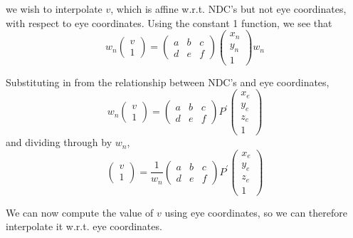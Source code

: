 \documentclass[11pt]{tingpset}
\begin{document}
  we wish to interpolate $v$, which is affine w.r.t. NDC's but not eye coordinates, with respect to eye coordinates. Using the constant 1 function, we see that
  \[
    w_n
    \begin{pmatrix}
      v \\
      1
    \end{pmatrix}
    =
    \begin{pmatrix}
      a & b & c \\
      d & e & f
    \end{pmatrix}
    \begin{pmatrix}
      x_n \\
      y_n \\
      1
    \end{pmatrix}
    w_n
  \]

  Substituting in from the relationship between NDC's and eye coordinates,
  \[
    w_n
    \begin{pmatrix}
      v \\
      1
    \end{pmatrix}
    =
    \begin{pmatrix}
      a & b & c \\
      d & e & f
    \end{pmatrix}
    P^\prime
    \begin{pmatrix}
      x_e \\
      y_e \\
      z_e \\
      1
    \end{pmatrix}
  \]
  and dividing through by $w_n$,
  \[
    \begin{pmatrix}
      v \\
      1
    \end{pmatrix}
    =
    \frac{1}{w_n}
    \begin{pmatrix}
      a & b & c \\
      d & e & f
    \end{pmatrix}
    P^\prime
    \begin{pmatrix}
      x_e \\
      y_e \\
      z_e \\
      1
    \end{pmatrix}
  \]

  We can now compute the value of $v$ using eye coordinates, so we can therefore interpolate it w.r.t. eye coordinates.
\end{document}
